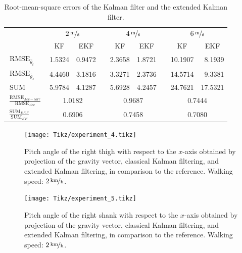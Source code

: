 \begin{table}\centering
{}
\begin{tabular}{@{}lrrcrrcrr@{}}\toprule
& \multicolumn{2}{c}{$\unitfrac[2]{m}{s}$} & \phantom{abc} & \multicolumn{2}{c}{$\unitfrac[4]{m}{s}$} &
\phantom{abc} & \multicolumn{2}{c}{$\unitfrac[6]{m}{s}$}\\ \cmidrule{2-3} \cmidrule{5-6} \cmidrule{8-9}
& \multicolumn{1}{c}{KF} & \multicolumn{1}{c}{EKF} &&  \multicolumn{1}{c}{KF} & \multicolumn{1}{c}{EKF} &&  \multicolumn{1}{c}{KF} & \multicolumn{1}{c}{EKF} \\ \midrule
$\operatorname{RMSE}_{\hat{\theta}_t}$ & 1.5324 & 0.9472 && 2.3658 & 1.8721 && 10.1907 & 8.1939 \\
$\operatorname{RMSE}_{\hat{\theta}_s}$ & 4.4460 & 3.1816 && 3.3271 & 2.3736 && 14.5714 & 9.3381 \\
$\operatorname{SUM}$ & 5.9784 & 4.1287 && 5.6928 & 4.2457 && 24.7621 & 17.5321 \\ \midrule
$\frac{\operatorname{RMSE}_{Acc-corr}}{\operatorname{RMSE}_{Acc}}$ & \multicolumn{2}{c}{1.0182} & \phantom{abc} & \multicolumn{2}{c}{0.9687} & 
\phantom{abc} & \multicolumn{2}{c}{0.7444}\\
$\frac{\operatorname{SUM}_{EKF}}{\operatorname{SUM}_{KF}}$ & \multicolumn{2}{c}{0.6906} & \phantom{abc} & \multicolumn{2}{c}{0.7458} & 
\phantom{abc} & \multicolumn{2}{c}{0.7080}\\
\bottomrule
\end{tabular}
\caption{Root-mean-square errors of the Kalman filter and the extended Kalman filter.}
\label{tab:rmse}
\end{table}

\begin{figure}
	\centering
	\setlength\figureheight{6.8cm} 
	\setlength\figurewidth{\textwidth}
	\texttt{[image: Tikz/experiment\_4.tikz]}
	\caption{Pitch angle of the right thigh with respect to the $x$-axis obtained by projection of the gravity vector, classical Kalman filtering, and extended Kalman filtering, in comparison to the reference. Walking speed: $\unitfrac[2]{km}{h}$.}
	\label{fig:experiment_4}
\end{figure}

\begin{figure}
	\centering
	\setlength\figureheight{6.8cm} 
	\setlength\figurewidth{\textwidth}
	\texttt{[image: Tikz/experiment\_5.tikz]}
	\caption{Pitch angle of the right shank with respect to the $x$-axis obtained by projection of the gravity vector, classical Kalman filtering, and extended Kalman filtering, in comparison to the reference. Walking speed: $\unitfrac[2]{km}{h}$.}
	\label{fig:experiment_5}
\end{figure}

